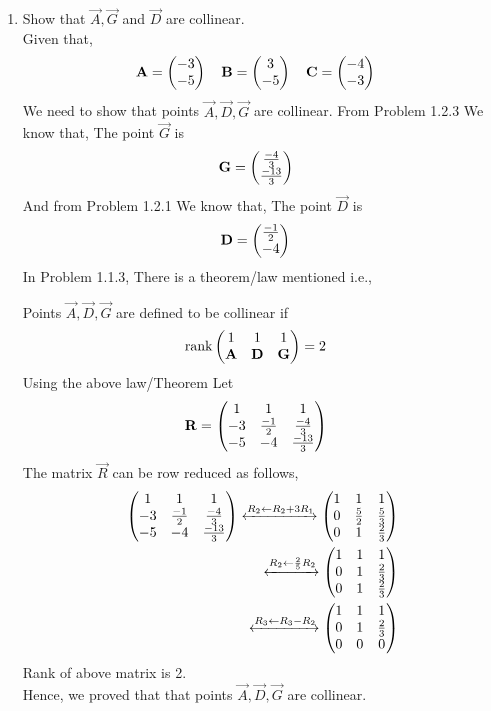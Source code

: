 \documentclass[11pt]{book}
\begin{document}
\begin{enumerate}[label=\thesection.\arabic*.,ref=\thesection.\theenumi]
\item Show that $\vec{A}, \vec{G}$ and $\vec{D}$ are collinear.\\
\solution 
Given that,
\begin{align}
    \mathbf{A} = \begin{pmatrix}-3\\-5\end{pmatrix}
    \quad
    \mathbf{B} &= \begin{pmatrix}3\\-5\end{pmatrix}
    \quad
    \mathbf{C} = \begin{pmatrix}-4\\-3\end{pmatrix}
\end{align}
We need to show that points $\vec{A},\vec{D},\vec{G}$ are collinear.
From Problem 1.2.3 We know that, The point $\vec{G}$ is 
\begin{align}
    \mathbf{G} &=\begin{pmatrix}\frac{-4}{3}\\ \frac{-13}{3}\end{pmatrix}
\end{align}
And from Problem 1.2.1 We know that, The point $\vec{D}$ is 
\begin{align}
    \mathbf{D} &=\begin{pmatrix}\frac{-1}{2}\\ -4\end{pmatrix}
\end{align}
In Problem 1.1.3, There is a theorem/law mentioned i.e.,

Points $\vec{A},\vec{D},\vec{G}$ are defined to be collinear if 
\begin{align}
    \text{rank}\begin{pmatrix}
    1 & 1 & 1\\
    \mathbf{A} & \mathbf{D} & \mathbf{G} \\
    \end{pmatrix} &= 2 
\end{align} 
Using the above law/Theorem Let
\begin{align}
    \mathbf{R}&=\begin{pmatrix}
    1 & 1 & 1
    \\
    -3 & \frac{-1}{2} & \frac{-4}{3}
    \\
    -5 & -4 & \frac{-13}{3}
    \end{pmatrix} 
\end{align} 
The matrix $\vec{R}$ can be row reduced as follows,
\begin{align}
    \label{eq:mat_row_operations}
    \myvec{
    1 & 1 & 1
    \\
    -3 & \frac{-1}{2} & \frac{-4}{3}
    \\
    -5 & -4 & \frac{-13}{3}
    }
     \xleftrightarrow[]{R_2 \leftarrow R_2+3R_1}
    \myvec{
    1 & 1 & 1
    \\
    0 & \frac{5}{2} & \frac{5}{3}
    \\
    0 & 1 & \frac{2}{3} 
    }
    \\
     \xleftrightarrow[]{R_2\leftarrow \frac{2}{5}R_2}
    \myvec{
    1 & 1 & 1
    \\
    0 & 1 & \frac{2}{3}
    \\
    0 & 1 &  \frac{2}{3}
    }
    \\
     \xleftrightarrow[]{R_3\leftarrow R_3-R_2}
    \myvec{
    1 & 1 & 1
    \\
    0 & 1 & \frac{2}{3}
    \\
    0 & 0 & 0
    }
\end{align}
Rank of above matrix is 2.\\
Hence, we proved that that points $\vec{A},\vec{D},\vec{G}$ are collinear.




\end{enumerate}
\end{document}
